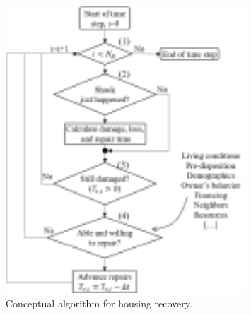 \begin{figure}[htb]
    \centering
    \includegraphics[width=0.8\textwidth, angle = 0]{Figures/HousingRecovery.pdf}
    \caption{Conceptual algorithm for housing recovery.}
    \label{fig:HousingRecovery}
\end{figure}


